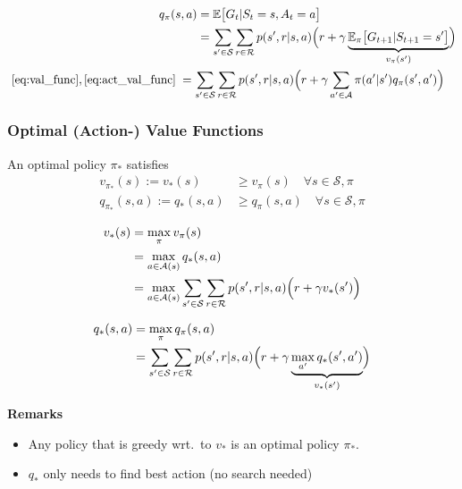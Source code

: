\noindent\begin{align}
    \begin{split}\label{eq:act_val_func}
        q_\pi(s,a) & = \mathbb{E}\bigl[G_t|S_t = s, A_t = a\bigr]                                                                                                                 \\
                   & = \sum_{s'\in \mathcal{S}}\sum_{r\in \mathcal{R}} p(s',r|s,a)\Bigl(r + \gamma \underbrace{\mathbb{E}_\pi\bigl[G_{t+1}|S_{t+1} = s'\bigr]}_{v_\pi(s')} \Bigr)
    \end{split} \\
    \begin{split}\nonumber
        ~\eqref{eq:val_func},\eqref{eq:act_val_func} \; & =\sum_{s'\in \mathcal{S}}\sum_{r\in \mathcal{R}} p(s',r|s,a)\Bigl(r + \gamma \sum_{a'\in \mathcal{A}} \pi(a'|s')q_\pi(s',a') \Bigr)
    \end{split}
\end{align}

\subsubsection{Optimal (Action-) Value Functions}
An optimal policy $\pi_*$ satisfies
\noindent\begin{align*}
    v_{\pi_*}(s):=v_*(s)     & \geq v_\pi(s) \quad\forall s\in \mathcal{S}, \pi   \\
    q_{\pi_*}(s,a):=q_*(s,a) & \geq q_\pi(s,a) \quad\forall s\in \mathcal{S}, \pi
\end{align*}

\noindent\begin{align*}
    v_*(s) & = \max_\pi v_\pi(s)                                                                                                   \\
           & =\max_{a\in \mathcal{A}(s)} q_*(s,a)                                                                                  \\
           & =\max_{a\in \mathcal{A}(s)}\sum_{s'\in \mathcal{S}}\sum_{r\in \mathcal{R}} p(s',r|s,a)\Bigl(r + \gamma v_*(s') \Bigr)
\end{align*}

\noindent\begin{align*}
    q_*(s,a) & = \max_\pi q_\pi(s,a)                                                                                                          \\
             & =\sum_{s'\in \mathcal{S}}\sum_{r\in \mathcal{R}} p(s',r|s,a)\Bigl(r + \gamma \underbrace{\max_{a'}q_*(s',a')}_{v_*(s')} \Bigr)
\end{align*}

\textbf{Remarks}
\begin{itemize}
    \item Any policy that is greedy wrt.\ to $v_*$ is an optimal policy $\pi_*$.
    \item $q_*$ only needs to find best action (no search needed)
\end{itemize}

